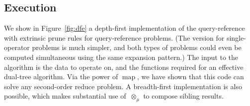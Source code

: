 \documentclass[times, leqno,twocolumn]{article}
\DeclareMathOperator*{\map}{map}
\newcommand{\fig}[1]{Figure~\ref{fig:#1}}
\newcommand{\nameop}[2]{{\scriptstyle\:}#1_{\!#2}}
\newcommand{\myop}[1]{\nameop{\otimes}{#1}}
\newcommand{\lettermu}{\mu}
\newcommand{\opmu}{\myop{\lettermu}}
\begin{document}
\subsection{Execution}

We show in \fig{dfe} a depth-first implementation of the query-reference with extrinsic prune rules for query-reference problems.
(The version for single-operator problems is much simpler, and both types of problems could even be computed simultaneous using the same expansion pattern.)
The input to the algorithm is the data to operate on, and the functions required for an effective dual-tree algorithm.
Via the power of $\map$, we have shown that this code can solve any second-order reduce problem.
A breadth-first implementation is also possible, which makes substantial use of $\opmu$ to compose sibling results.
\end{document}

